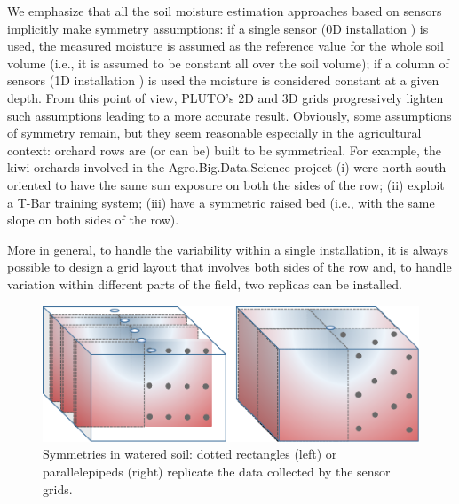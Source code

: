 We emphasize that all the soil moisture estimation approaches based on sensors implicitly make symmetry assumptions: if a single sensor (0D installation \cite{arif2013estimation}) is used, the measured moisture is assumed as the reference value for the whole soil volume (i.e., it is assumed to be constant all over the soil volume); if a column of sensors (1D installation \cite{Karandish2016892, Goldstein2018421, Jimenez20201327, Pan2021, Li20152382}) is used the moisture is considered constant at a given depth. From this point of view, PLUTO's 2D and 3D grids progressively lighten such assumptions leading to a more accurate result. Obviously, some assumptions of symmetry remain, but they seem reasonable especially in the agricultural context: orchard rows are (or can be) built to be symmetrical. For example, the kiwi orchards involved in the Agro.Big.Data.Science project (i) were north-south oriented to have the same sun exposure on both the sides of the row; (ii) exploit a T-Bar training system; (iii) have a symmetric raised bed (i.e., with the same slope on both sides of the row). 

More in general, to handle the variability within a single installation, it is always possible to design a grid layout that involves both sides of the row and, to handle variation within different parts of the field, two replicas can be installed. 

\begin{figure}[t]
\centering
\includegraphics[scale=.6]{chapters/physics-aware/pluto/img/SensorGrid3.pdf}
\caption{Symmetries in watered soil: dotted rectangles (left) or parallelepipeds (right) replicate the data collected by the sensor grids.}
\label{pluto-fig:symm}
\end{figure}

